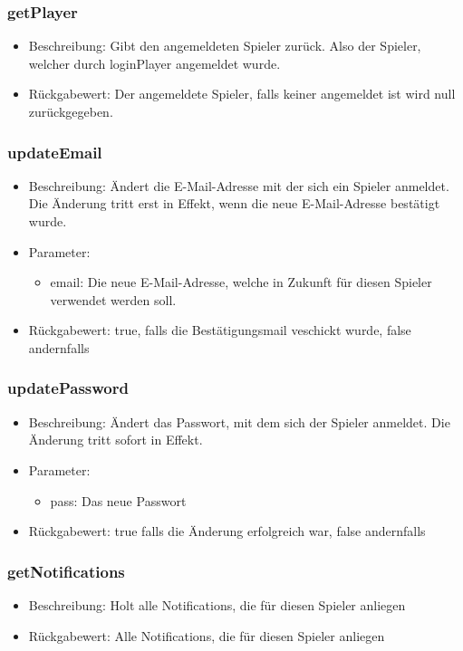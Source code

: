 \documentclass[a4paper]{scrreprt}
\begin{document}
	\subsubsection{getPlayer}
	\begin{itemize}
		\item Beschreibung: Gibt den angemeldeten Spieler zurück. Also der Spieler, welcher durch loginPlayer angemeldet wurde.
		\item Rückgabewert: Der angemeldete Spieler, falls keiner angemeldet ist wird null zurückgegeben. 
	\end{itemize}
	\subsubsection{updateEmail}
	\begin{itemize}
		\item Beschreibung: Ändert die E-Mail-Adresse mit der sich ein Spieler anmeldet. Die Änderung tritt erst in Effekt, wenn die neue E-Mail-Adresse bestätigt wurde.
		\item Parameter:
		\begin{itemize}
			\item email: Die neue E-Mail-Adresse, welche in Zukunft für diesen Spieler verwendet werden soll.
		\end{itemize}
		\item Rückgabewert: true, falls die Bestätigungsmail veschickt wurde, false andernfalls 
	\end{itemize}
	\subsubsection{updatePassword}
	\begin{itemize}
		\item Beschreibung: Ändert das Passwort, mit dem sich der Spieler anmeldet. Die Änderung tritt sofort in Effekt.
		\item Parameter:
		\begin{itemize}
			\item pass: Das neue Passwort
		\end{itemize}
		\item Rückgabewert: true falls die Änderung erfolgreich war, false andernfalls 
	\end{itemize}
	\subsubsection{getNotifications}
	\begin{itemize}
		\item Beschreibung: Holt alle Notifications, die für diesen Spieler anliegen
		\item Rückgabewert:  Alle Notifications, die für diesen Spieler anliegen
	\end{itemize}
\end{document}
